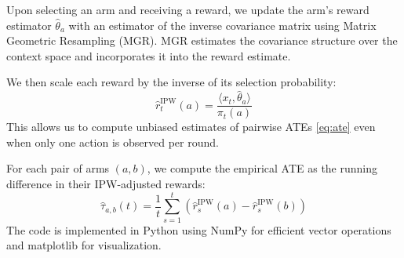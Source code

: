     
    Upon selecting an arm and receiving a reward, we update the arm's reward estimator $\hat{\theta}_a$ with an estimator of the inverse covariance matrix using Matrix Geometric Resampling (MGR). MGR estimates the covariance structure over the context space and incorporates it into the reward estimate.

We then scale each reward by the inverse of its selection probability:
    \[
    \hat{r}^{\text{IPW}}_t(a) = \frac{\langle x_t, \hat{\theta}_a \rangle}{\pi_t(a)}
    \]
    This allows us to compute unbiased estimates of pairwise ATEs \ref{eq:ate} even when only one action is observed per round.


For each pair of arms $(a, b)$, we compute the empirical ATE as the running difference in their IPW-adjusted rewards:
    \[
    \hat{\tau}_{a,b}(t) = \frac{1}{t} \sum_{s=1}^t \left( \hat{r}^{\text{IPW}}_s(a) - \hat{r}^{\text{IPW}}_s(b) \right)
    \]
The code is implemented in Python using NumPy for efficient vector operations and matplotlib for visualization.